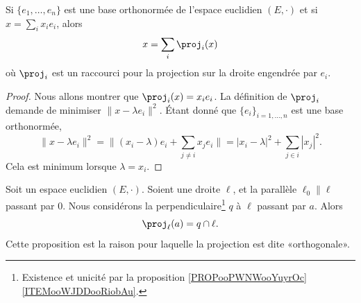 \begin{proposition}	\label{PROPooJIMHooGVzhLh}
	Si \( \{ e_1,\ldots,e_n \}\) est une base orthonormée de l'espace euclidien \( (E,\cdot)\) et si \( x=\sum_ix_ie_i\), alors
	\begin{equation}
		x=\sum_i\proj_i(x)
	\end{equation}
	où \( \proj_i\) est un raccourci pour la projection sur la droite engendrée par \( e_i\).
\end{proposition}

\begin{proof}
	Nous allons montrer que \( \proj_i(x)=x_ie_i\). La définition de \( \proj_i\) demande de minimiser \( \| x-\lambda e_i \|^2\). Étant donné que \( \{ e_i \}_{i=1,\ldots,n}\) est une base orthonormée,
	\begin{equation}
		\| x-\lambda e_i \|^2  =\| (x_i-\lambda)e_i+\sum_{j\neq i}x_je_i \|
		=| x_i-\lambda |^2+\sum_{j\in i}| x_j |^2.
	\end{equation}
	Cela est minimum lorsque \( \lambda=x_i\).
\end{proof}

\begin{proposition}	\label{PROPooOXEDooXxmRHj}
	Soit un espace euclidien \( (E,\cdot)\). Soient une droite \( \ell\), et la parallèle \( \ell_0\parallel \ell\) passant par \( 0\). Nous considérons la perpendiculaire\footnote{Existence et unicité par la proposition \ref{PROPooPWNWooYuyrOc}\ref{ITEMooWJDDooRiobAu}.} \( q \) à \( \ell\) passant par \( a\). Alors
	\begin{equation}
		\proj_{\ell}(a)=q\cap\ell.
	\end{equation}
	Cette proposition est la raison pour laquelle la projection est dite «orthogonale».
\end{proposition}

